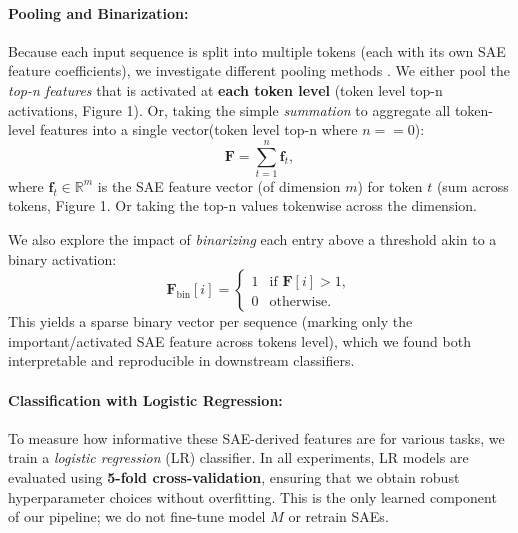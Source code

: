 \paragraph{Pooling and Binarization:}
Because each input sequence is split into multiple tokens (each with its own SAE feature coefficients), we investigate different pooling methods . We either pool the \emph{top-n features} that is activated at \textbf{each token level} (token level top-n activations, Figure 1). Or, taking the simple \emph{summation} to aggregate all token-level features into a single vector(token level top-n where $n == 0$):
\[
    \mathbf{F} = \sum_{t=1}^n \mathbf{f}_t,
\]
where $\mathbf{f}_t \in \mathbb{R}^m$ is the SAE feature vector (of dimension $m$) for token $t$ (sum across tokens, Figure 1.  Or taking the top-n values tokenwise across the dimension. 



We also explore the impact of \emph{binarizing} each entry above a threshold akin to a binary activation:
\[
    \mathbf{F}_{\text{bin}}[i] = 
    \begin{cases}
      1 & \text{if } \mathbf{F}[i] > 1, \\
      0 & \text{otherwise}.
    \end{cases}
\]
This yields a sparse binary vector per sequence (marking only the important/activated SAE feature across tokens level), which we found both interpretable and reproducible in downstream classifiers.

\paragraph{Classification with Logistic Regression:}
To measure how informative these SAE-derived features are for various tasks, we train a \emph{logistic regression} (LR) classifier. In all experiments, LR models are evaluated using \textbf{5-fold cross-validation}, ensuring that we obtain robust hyperparameter choices without overfitting. This is the only learned component of our pipeline; we do not fine-tune model $M$ or retrain SAEs.

